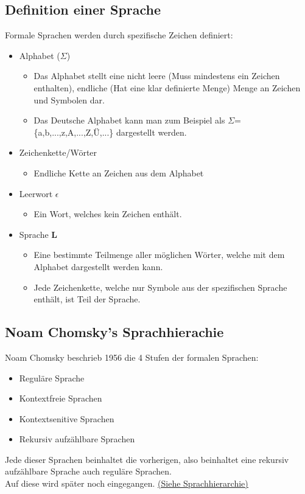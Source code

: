 \documentclass{article}
\begin{document}
	\subsection{Definition einer Sprache}
	Formale Sprachen werden durch spezifische Zeichen definiert:
	\begin{itemize}
		\item{Alphabet ($\Sigma$)}
		\begin{itemize}
			\item{Das Alphabet stellt eine nicht leere (Muss mindestens ein Zeichen enthalten), endliche (Hat eine klar definierte Menge) Menge an Zeichen und Symbolen dar.}
			\item{Das Deutsche Alphabet kann man zum Beispiel als $\Sigma$=\{a,b,...,z,A,...,Z,Ü,...\} dargestellt werden.}
		\end{itemize}
		\item{Zeichenkette/Wörter}
		\begin{itemize}
			\item{Endliche Kette an Zeichen aus dem Alphabet}
		\end{itemize}
		\item{Leerwort $\epsilon$}
		\begin{itemize}
			\item{Ein Wort, welches kein Zeichen enthält.}
		\end{itemize}
		\item{Sprache \textbf{L}}
		\begin{itemize}
			\item{Eine bestimmte Teilmenge aller möglichen Wörter, welche mit dem Alphabet dargestellt werden kann.}
			\item{Jede Zeichenkette, welche nur Symbole aus der spezifischen Sprache enthält, ist Teil der Sprache.}
		\end{itemize}
	\end{itemize}
	\subsection{Noam Chomsky's Sprachhierachie}
	Noam Chomsky beschrieb 1956 die 4 Stufen der formalen Sprachen:
	\begin{itemize}
		\item{Reguläre Sprache}
		\item{Kontextfreie Sprachen}
		\item{Kontextsenitive Sprachen}
		\item{Rekursiv aufzählbare Sprachen}
	\end{itemize}
	Jede dieser Sprachen beinhaltet die vorherigen, also beinhaltet eine rekursiv aufzählbare Sprache auch reguläre Sprachen. \\
	Auf diese wird später noch eingegangen. \hyperref[sec:Sprachhierarchie]{\underline{(Siehe Sprachhierarchie)}}
\end{document}
